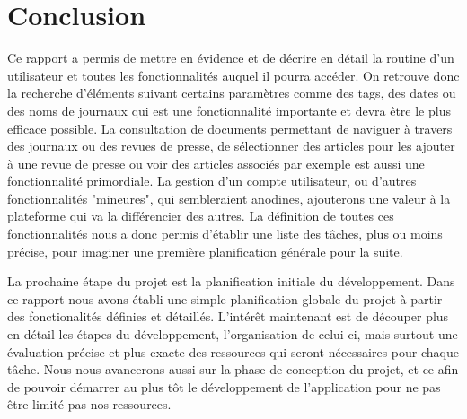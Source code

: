 \section{Conclusion}
\label{sec:conc}

Ce rapport a permis de mettre en évidence et de décrire en détail la routine d'un utilisateur et toutes les fonctionnalités auquel il pourra accéder. On retrouve donc la recherche d'éléments suivant certains paramètres comme des tags, des dates ou des noms de journaux qui est une fonctionnalité importante et devra être le plus efficace possible. La consultation de documents permettant de naviguer à travers des journaux ou des revues de presse, de sélectionner des articles pour les ajouter à une revue de presse ou voir des articles associés par exemple est aussi une fonctionnalité primordiale. La gestion d'un compte utilisateur, ou d'autres fonctionnalités "mineures", qui sembleraient anodines, ajouterons une valeur à la plateforme qui va la différencier des autres. La définition de toutes ces fonctionnalités nous a donc permis d'établir une liste des tâches, plus ou moins précise, pour imaginer une première planification générale pour la suite. 

La prochaine étape du projet est la planification initiale du développement. Dans ce rapport nous avons établi une simple planification globale du projet à partir des fonctionalités définies et détaillés. L'intérêt maintenant est de découper plus en détail les étapes du développement, l'organisation de celui-ci, mais surtout une évaluation précise et plus exacte des ressources qui seront nécessaires pour chaque tâche. Nous nous avancerons aussi sur la phase de conception du projet, et ce afin de pouvoir démarrer au plus tôt le développement de l'application pour ne pas être limité pas nos ressources.
